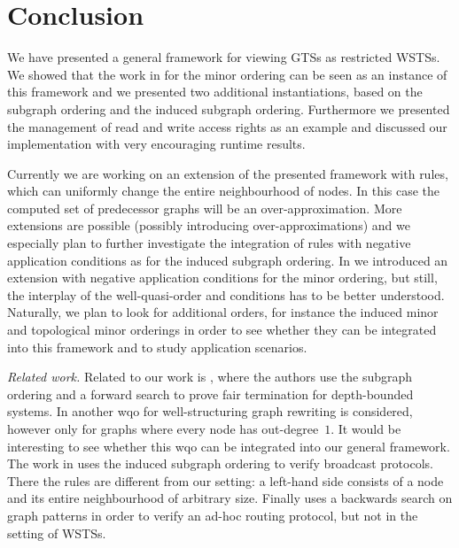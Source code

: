 \documentclass{llncs}
\begin{document}
\section{Conclusion}
\label{sec:conclusion}

We have presented a general framework for viewing GTSs as restricted
WSTSs. We showed that the work in \cite{JK08} for the minor ordering
can be seen as an instance of this framework and we presented two
additional instantiations, based on the subgraph ordering and the
induced subgraph ordering. Furthermore we presented the management of
read and write access rights as an example and discussed our
implementation with very encouraging runtime results. 


Currently we are working on an extension of the presented framework
with rules, which can uniformly change the entire neighbourhood of
nodes. In this case the computed set of predecessor graphs will be an
over-approximation.  More extensions are possible (possibly
introducing over-approximations) and we especially plan to further
investigate the integration of rules with negative application
conditions as for the induced subgraph ordering.  In
\cite{ks:wsts-nac} we introduced an extension with negative
application conditions for the minor ordering, but still, the
interplay of the well-quasi-order and conditions has to be better
understood.  Naturally, we plan to look for additional orders, for
instance the induced minor and topological minor orderings
\cite{fhr:wqo-bounded-treewidth} in order to see whether they can be
integrated into this framework and to study application scenarios.

\smallskip

\noindent \textit{Related work.}  Related to our work is
\cite{BKWZ:2013}, where the authors use the subgraph ordering and a
forward search to prove fair termination for depth-bounded systems.
In \cite{abchr:monotonic-abstraction-heaps} another wqo
for well-structuring graph rewriting is considered, however only for
graphs where every node has out-degree~$1$. It would be interesting to
see whether this wqo can be integrated into our general
framework. The work in \cite{dsz:verification-ad-hoc-networks} uses
the induced subgraph ordering to verify broadcast protocols.
There the rules are different from our setting: a left-hand side
consists of a node and its entire neighbourhood of arbitrary size.
Finally \cite{swj:gg-verification-adhocrouting} uses a backwards
search on graph patterns in order to verify an ad-hoc routing
protocol, but not in the setting of WSTSs.
\end{document}
